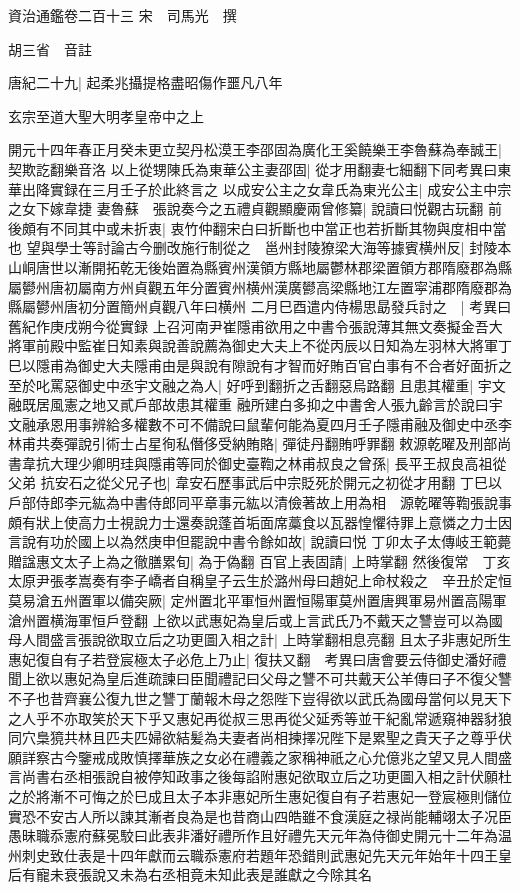 資治通鑑卷二百十三
宋　司馬光　撰

胡三省　音註

唐紀二十九|{
	起柔兆攝提格盡昭傷作噩凡八年}


玄宗至道大聖大明孝皇帝中之上

開元十四年春正月癸未更立契丹松漠王李邵固為廣化王奚饒樂王李魯蘇為奉誠王|{
	契欺訖翻樂音洛}
以上從甥陳氏為東華公主妻邵固|{
	從才用翻妻七細翻下同考異曰東華出降實録在三月壬子於此終言之}
以成安公主之女韋氏為東光公主|{
	成安公主中宗之女下嫁韋捷}
妻魯蘇　張說奏今之五禮貞觀顯慶兩曾修纂|{
	說讀曰悦觀古玩翻}
前後頗有不同其中或未折衷|{
	衷竹仲翻宋白曰折斷也中當正也若折斷其物與度相中當也}
望與學士等討論古今删改施行制從之　邕州封陵獠梁大海等據賓横州反|{
	封陵本山峒唐世以漸開拓乾无後始置為縣賓州漢領方縣地屬鬱林郡梁置領方郡隋廢郡為縣屬鬰州唐初屬南方州貞觀五年分置賓州横州漢廣鬰高梁縣地江左置寜浦郡隋廢郡為縣屬鬰州唐初分置簡州貞觀八年曰横州}
二月巳酉遣内侍楊思勗發兵討之　|{
	考異曰舊紀作庚戌朔今從實録}
上召河南尹崔隱甫欲用之中書令張說薄其無文奏擬金吾大將軍前殿中監崔日知素與說善說薦為御史大夫上不從丙辰以日知為左羽林大將軍丁巳以隱甫為御史大夫隱甫由是與說有隙說有才智而好賄百官白事有不合者好面折之至於叱罵惡御史中丞宇文融之為人|{
	好呼到翻折之舌翻惡烏路翻}
且患其權重|{
	宇文融既居風憲之地又貳戶部故患其權重}
融所建白多抑之中書舍人張九齡言於說曰宇文融承恩用事辨給多權數不可不備說曰鼠輩何能為夏四月壬子隱甫融及御史中丞李林甫共奏彈說引術士占星徇私僭侈受納賄賂|{
	彈徒丹翻賄呼罪翻}
敕源乾曜及刑部尚書韋抗大理少卿明珪與隱甫等同於御史臺鞫之林甫叔良之曾孫|{
	長平王叔良高祖從父弟}
抗安石之從父兄子也|{
	韋安石歷事武后中宗貶死於開元之初從才用翻}
丁巳以戶部侍郎李元紘為中書侍郎同平章事元紘以清儉著故上用為相　源乾曜等鞫張說事頗有狀上使高力士視說力士還奏說蓬首垢面席藁食以瓦器惶懼待罪上意憐之力士因言說有功於國上以為然庚申但罷說中書令餘如故|{
	說讀曰悦}
丁卯太子太傳岐王範薨贈諡惠文太子上為之徹膳累旬|{
	為于偽翻}
百官上表固請|{
	上時掌翻}
然後復常　丁亥太原尹張孝嵩奏有李子嶠者自稱皇子云生於潞州母曰趙妃上命杖殺之　辛丑於定恒莫易滄五州置軍以備突厥|{
	定州置北平軍恒州置恒陽軍莫州置唐興軍易州置高陽軍滄州置横海軍恒戶登翻}
上欲以武惠妃為皇后或上言武氏乃不戴天之讐豈可以為國母人間盛言張說欲取立后之功更圖入相之計|{
	上時掌翻相息亮翻}
且太子非惠妃所生惠妃復自有子若登宸極太子必危上乃止|{
	復扶又翻　考異曰唐會要云侍御史潘好禮聞上欲以惠妃為皇后進疏諫曰臣聞禮記曰父母之讐不可共戴天公羊傳曰子不復父讐不子也昔齊襄公復九世之讐丁蘭報木母之怨陛下豈得欲以武氏為國母當何以見天下之人乎不亦取笑於天下乎又惠妃再從叔三思再從父延秀等並干紀亂常遞窺神器豺狼同穴梟獍共林且匹夫匹婦欲結髪為夫妻者尚相揀擇况陛下是累聖之貴天子之尊乎伏願詳察古今鑒戒成敗慎擇華族之女必在禮義之家稱神祇之心允億兆之望又見人間盛言尚書右丞相張說自被停知政事之後每諂附惠妃欲取立后之功更圖入相之計伏願杜之於將漸不可悔之於巳成且太子本非惠妃所生惠妃復自有子若惠妃一登宸極則儲位實恐不安古人所以諫其漸者良為是也昔商山四皓雖不食漢庭之禄尚能輔翊太子况臣愚昧職忝憲府蘇冕駮曰此表非潘好禮所作且好禮先天元年為侍御史開元十二年為温州刺史致仕表是十四年獻而云職忝憲府若題年恐錯則武惠妃先天元年始年十四王皇后有寵未衰張說又未為右丞相竟未知此表是誰獻之今除其名}
